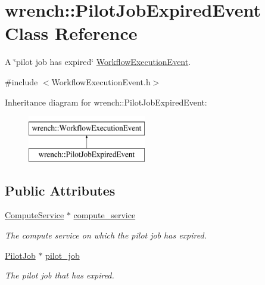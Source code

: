 \hypertarget{classwrench_1_1_pilot_job_expired_event}{}\section{wrench\+:\+:Pilot\+Job\+Expired\+Event Class Reference}
\label{classwrench_1_1_pilot_job_expired_event}


A \char`\"{}pilot job has expired\char`\"{} \hyperlink{classwrench_1_1_workflow_execution_event}{Workflow\+Execution\+Event}.  




{\ttfamily \#include $<$Workflow\+Execution\+Event.\+h$>$}

Inheritance diagram for wrench\+:\+:Pilot\+Job\+Expired\+Event\+:\begin{figure}[H]
\begin{center}
\leavevmode
\includegraphics[height=2.000000cm]{classwrench_1_1_pilot_job_expired_event}
\end{center}
\end{figure}
\subsection*{Public Attributes}
\begin{DoxyCompactItemize}
\item 
\mbox{\label{classwrench_1_1_pilot_job_expired_event_aebbb89a30b8f24f1c7866df191293e7b}} 
\hyperlink{classwrench_1_1_compute_service}{Compute\+Service} $\ast$ \hyperlink{classwrench_1_1_pilot_job_expired_event_aebbb89a30b8f24f1c7866df191293e7b}{compute\+\_\+service}
\begin{DoxyCompactList}\small\item\em The compute service on which the pilot job has expired. \end{DoxyCompactList}\item 
\mbox{\label{classwrench_1_1_pilot_job_expired_event_a049f2f444c6185e9346173253f3b2a21}} 
\hyperlink{classwrench_1_1_pilot_job}{Pilot\+Job} $\ast$ \hyperlink{classwrench_1_1_pilot_job_expired_event_a049f2f444c6185e9346173253f3b2a21}{pilot\+\_\+job}
\begin{DoxyCompactList}\small\item\em The pilot job that has expired. \end{DoxyCompactList}\end{DoxyCompactItemize}
